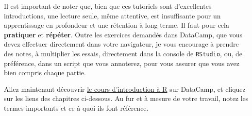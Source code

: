 \documentclass[
  a4paper,
  DIV=11,
  numbers=noendperiod,
  oneside]{scrreprt}
\begin{document}
Il est important de noter que, bien que ces tutoriels sont d'excellentes
introductions, une lecture seule, même attentive, est insuffisante pour
un apprentissage en profondeur et une rétention à long terme. Il faut
pour cela \textbf{pratiquer} et \textbf{répéter}. Outre les exercices
demandés dans DataCamp, que vous devez effectuer directement dans votre
navigateur, je vous encourage à prendre des notes, à multiplier les
essais, directement dans la console de \texttt{RStudio}, ou, de
préférence, dans un script que vous annoterez, pour vous assurer que
vous avez bien compris chaque partie.

Allez maintenant découvrir
\href{https://app.datacamp.com/learn/courses/introduction-a-r}{le cours
d'introduction à R} sur DataCamp, et cliquez sur les liens des chapitres
ci-dessous. Au fur et à mesure de votre travail, notez les termes
importants et ce à quoi ils font référence.
\end{document}
